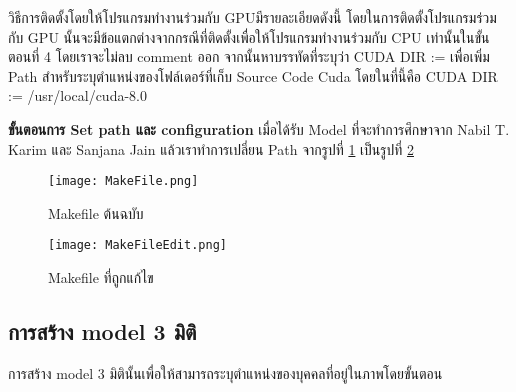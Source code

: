   วิธีการติดตั้งโดยให้โปรแกรมทำงานร่วมกับ GPUมีรายละเอียดดังนี้
  โดยในการติดตั้งโปรแกรมร่วมกับ GPU นั้นจะมีข้อแตกต่างจากกรณีที่ติดตั้งเพื่อให้โปรแกรมทำงานร่วมกับ CPU เท่านั้นในขั้นตอนที่ 4 โดยเราจะไม่ลบ comment ออก จากนั้นหาบรรทัดที่ระบุว่า CUDA DIR := เพื่อเพิ่ม Path สำหรับระบุตำแหน่งของโฟล์เดอร์ที่เก็บ Source Code Cuda โดยในที่นี้คือ CUDA DIR := /usr/local/cuda-8.0
  
 \textbf{ขั้นตอนการ Set path และ configuration}
  เมื่อได้รับ Model ที่จะทำการศึกษาจาก Nabil T. Karim \cite{nabil} และ Sanjana Jain \cite{sanjana} แล้วเราทำการเปลี่ยน Path จากรูปที่ \ref{fig:before} เป็นรูปที่ \ref{fig:after}
 \begin{center}
 \begin{figure}[t]
  \centerline{
    \texttt{[image: MakeFile.png]}
    }
  \centering
  \caption{Makefile ต้นฉบับ}
  \label{fig:before}
  \hrulefill
\end{figure}
 \end{center}

  \begin{center}
 \begin{figure}[t]
  \centerline{
    \texttt{[image: MakeFileEdit.png]}
    }
  \centering
  \caption{Makefile ที่ถูกแก้ไข}
  \label{fig:after}
  \hrulefill
\end{figure}
   \end{center}
\subsection{การสร้าง model 3 มิติ}
การสร้าง model 3 มิตินั้นเพื่อให้สามารถระบุตำแหน่งของบุคคลที่อยู่ในภาพโดยขั้นตอน
